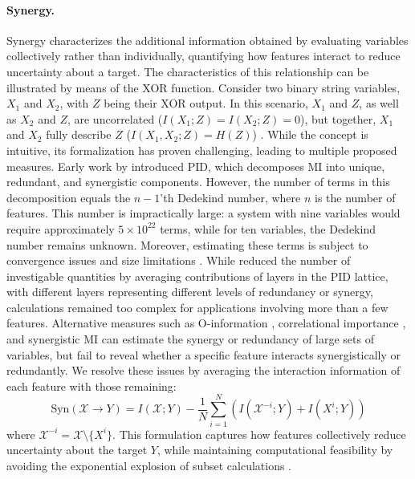 \documentclass{article}
\theoremstyle{definition}
\theoremstyle{remark}
\begin{document}
\paragraph{Synergy.} 
Synergy characterizes the additional information obtained by evaluating variables collectively rather than individually, quantifying how features interact to reduce uncertainty about a target. The characteristics of this relationship can be illustrated by means of the XOR function. Consider two binary string variables, $X_1$ and $X_2$, with $Z$ being their XOR output. In this scenario, $X_1$ and $Z$, as well as $X_2$ and $Z$, are uncorrelated ($I(X_1;Z) = I(X_2;Z) = 0$), but together, $X_1$ and $X_2$ fully describe $Z$ ($I(X_1, X_2;Z) = H(Z)$) \citep{guyon2003introduction,williams2010nonnegative}. While the concept is intuitive, its formalization has proven challenging, leading to multiple proposed measures. Early work by \citet{williams2010nonnegative} introduced PID, which decomposes MI into unique, redundant, and synergistic components. However, the number of terms in this decomposition equals the $n-1$'th Dedekind number, where $n$ is the number of features. This number is impractically large: a system with nine variables would require approximately $5 \times 10^{22}$ terms, while for ten variables, the Dedekind number remains unknown. Moreover, estimating these terms is subject to convergence issues and size limitations \citep{makkeh2018broja,makkeh2019maxent3d,pakman2021estimating}. While \citet{varley2022emergence} reduced the number of investigable quantities by averaging contributions of layers in the PID lattice, with different layers representing different levels of redundancy or synergy, calculations remained too complex for applications involving more than a few features. Alternative measures such as O-information \citep{rosas2019quantifying}, correlational importance \citep{nirenberg2003decoding}, and synergistic MI \citep{griffith2014quantifying} can estimate the synergy or redundancy of large sets of variables, but fail to reveal whether a specific feature interacts synergistically or redundantly. We resolve these issues by averaging the interaction information of each feature with those remaining:
\begin{equation}
\text{Syn}(\mathcal{X} \to Y) = I(\mathcal{X}; Y) - \frac{1}{N}\sum_{i=1}^{N} \left(I(\mathcal{X}^{-i}; Y) + I(X^i; Y)\right)\end{equation}
where $\mathcal{X}^{-i} = \mathcal{X} \setminus \{X^i\}$. This formulation captures how features collectively reduce uncertainty about the target $Y$, while maintaining computational feasibility by avoiding the exponential explosion of subset calculations \citep{westphal2025partial}.
\end{document}
